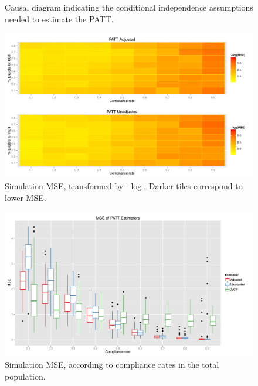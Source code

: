 \documentclass[12pt]{article}
\begin{document}



\pagebreak
\begin{appendices}

\begin{figure}[htb]
\centering
{}
\caption{Causal diagram indicating the conditional independence assumptions needed to estimate the PATT.}\label{fig:DAG}
\end{figure}

\begin{figure}[htbp]
\begin{center}
\includegraphics[width = 1\textwidth]{mse_ratec_rates_B5}
\caption{Simulation MSE, transformed by -$\log$. Darker tiles correspond to lower MSE.}
\label{fig:sim_tiles}
\end{center}
\end{figure}

\begin{figure}[htbp]
\begin{center}
\includegraphics[width = 1\textwidth]{mse_boxplots_B5}
\caption{Simulation MSE, according to compliance rates in the total population.}
\label{fig:sim_compliance}
\end{center}
\end{figure}


\end{appendices}
\end{document}
